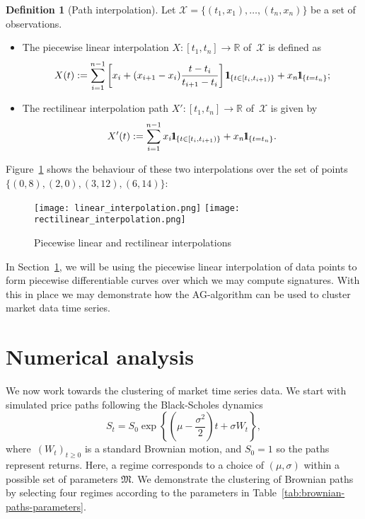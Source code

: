 \documentclass{amsart}[11pt]
\numberwithin{equation}{section}
\theoremstyle{definition}
\newtheorem{definition}[theorem]{Definition}
\newcommand{\ind}{1\hspace{-2.1mm}{1}} %
\newcommand{\Xx}{\mathcal{X}}
\newcommand{\RR}{\mathbb{R}}
\newcommand{\Mf}{\mathfrak{M}}
\begin{document}
\begin{definition}[Path interpolation]
Let $\Xx = \{(t_1, x_1), \ldots, (t_n, x_n)\}$ be a set of observations.
\begin{itemize}
\item The piecewise linear interpolation  $X: [t_1, t_n] \to \RR$ of~$\Xx$ is defined as
$$
X(t) := \sum_{i = 1}^{n-1} \left[x_i + (x_{i+1}-x_i)\frac{t - t_i}{t_{i+1}-t_i}\right]\ind_{\{t \in [t_i, t_{i+1})\}} + x_n \ind_{\{t = t_n\}};
$$
\item The rectilinear interpolation path $X':[t_1, t_n] \to \RR$ of~$\Xx$ is given by
$$
X'(t) := \sum_{i = 1}^{n-1} x_i \ind_{\{t \in [t_i, t_{i+1})\}} + x_n \ind_{\{t = t_n\}}.
$$
\end{itemize}
\end{definition}
Figure~\ref{fig:data-interpolation} shows the behaviour of these two interpolations over the set of points $\{(0, 8), (2,0), (3, 12), (6, 14)\}$:

\begin{figure}[ht]
    \centering
        \texttt{[image: linear\_interpolation.png]}
        \texttt{[image: rectilinear\_interpolation.png]}
    \caption{Piecewise linear and rectilinear interpolations}
    \label{fig:data-interpolation}
\end{figure}

In Section~\ref{sec:Application}, we will be using the piecewise linear interpolation of data points to form piecewise differentiable curves over which we may compute signatures. With this in place we may demonstrate how the AG-algorithm can be used to cluster market data time series.

\section{Numerical analysis}\label{sec:Application}

We now work towards the clustering of market time series data.
We start with simulated price paths following the Black-Scholes dynamics
\begin{equation}\label{eq:gbm-solution}
S_t = S_0 \exp \left\{ \left(\mu - \frac{\sigma^2}{2}\right)t + \sigma W_t \right\},
\end{equation}
where~$(W_t)_{t\geq 0}$ is a standard Brownian motion, and $S_0=1$ so the paths represent returns.
Here, a regime corresponds to a choice of $(\mu, \sigma)$
within a possible set of parameters $\Mf$.
We demonstrate the clustering of Brownian paths by selecting four regimes according to the parameters in Table~\ref{tab:brownian-paths-parameters}.
\end{document}
